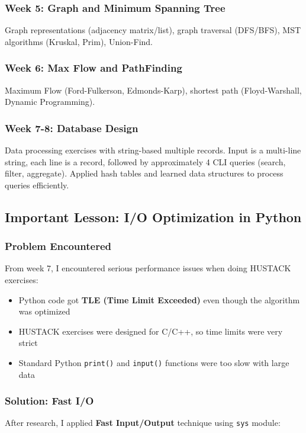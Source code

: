 \documentclass[12pt,a4paper]{article}
\begin{document}
\subsubsection{Week 5: Graph and Minimum Spanning Tree}
Graph representations (adjacency matrix/list), graph traversal (DFS/BFS), MST algorithms (Kruskal, Prim), Union-Find.

\subsubsection{Week 6: Max Flow and PathFinding}
Maximum Flow (Ford-Fulkerson, Edmonds-Karp), shortest path (Floyd-Warshall, Dynamic Programming).

\subsubsection{Week 7-8: Database Design}
Data processing exercises with string-based multiple records. Input is a multi-line string, each line is a record, followed by approximately 4 CLI queries (search, filter, aggregate). Applied hash tables and learned data structures to process queries efficiently.

\subsection{Important Lesson: I/O Optimization in Python}

\subsubsection{Problem Encountered}
From week 7, I encountered serious performance issues when doing HUSTACK exercises:
\begin{itemize}
    \item Python code got \textbf{TLE (Time Limit Exceeded)} even though the algorithm was optimized
    \item HUSTACK exercises were designed for C/C++, so time limits were very strict
    \item Standard Python \texttt{print()} and \texttt{input()} functions were too slow with large data
\end{itemize}

\subsubsection{Solution: Fast I/O}
After research, I applied \textbf{Fast Input/Output} technique using \texttt{sys} module:
\end{document}
